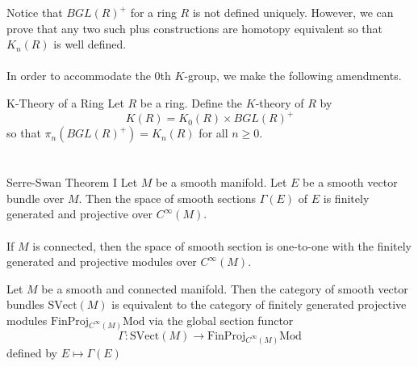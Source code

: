 \documentclass[a4paper]{article}
\begin{document}
Notice that $BGL(R)^+$ for a ring $R$ is not defined uniquely. However, we can prove that any two such plus constructions are homotopy equivalent so that $K_n(R)$ is well defined. \\~\\

In order to accommodate the $0$th $K$-group, we make the following amendments. 

\begin{defn}{K-Theory of a Ring}{} Let $R$ be a ring. Define the $K$-theory of $R$ by $$K(R)=K_0(R)\times BGL(R)^+$$ so that $\pi_n(BGL(R)^+)=K_n(R)$ for all $n\geq 0$. 
\end{defn}

\section{}
\subsection{}
\begin{thm}{Serre-Swan Theorem I}{} Let $M$ be a smooth manifold. Let $E$ be a smooth vector bundle over $M$. Then the space of smooth sections $\Gamma(E)$ of $E$ is finitely generated and projective over $C^\infty(M)$. \\~\\

If $M$ is connected, then the space of smooth section is one-to-one with the finitely generated and projective modules over $C^\infty(M)$. 
\end{thm}

\begin{thm}{}{} Let $M$ be a smooth and connected manifold. Then the category of smooth vector bundles $\text{SVect}(M)$ is equivalent to the category of finitely generated projective modules $\text{FinProj}{_{C^\infty(M)}\text{Mod}}$ via the global section functor $$\Gamma:\text{SVect}(M)\to\text{FinProj}{_{C^\infty(M)}\text{Mod}}$$ defined by $E\mapsto\Gamma(E)$
\end{thm}

\subsection{}
\end{document}
